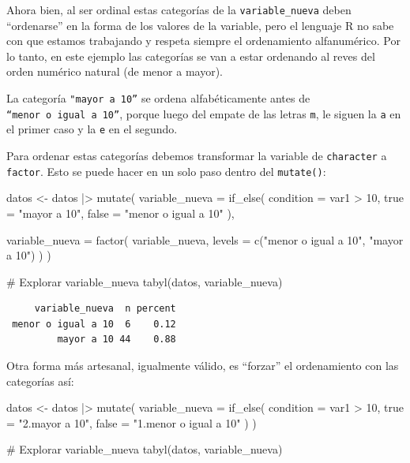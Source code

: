 \documentclass[
  spanish,
  a4paper,
]{scrbook}
\newenvironment{Shaded}{\begin{snugshade}}{\end{snugshade}}
\newcommand{\AttributeTok}[1]{\textcolor[rgb]{0.40,0.45,0.13}{#1}}
\newcommand{\CommentTok}[1]{\textcolor[rgb]{0.37,0.37,0.37}{#1}}
\newcommand{\DecValTok}[1]{\textcolor[rgb]{0.68,0.00,0.00}{#1}}
\newcommand{\FunctionTok}[1]{\textcolor[rgb]{0.28,0.35,0.67}{#1}}
\newcommand{\NormalTok}[1]{\textcolor[rgb]{0.00,0.23,0.31}{#1}}
\newcommand{\OtherTok}[1]{\textcolor[rgb]{0.00,0.23,0.31}{#1}}
\newcommand{\SpecialCharTok}[1]{\textcolor[rgb]{0.37,0.37,0.37}{#1}}
\newcommand{\StringTok}[1]{\textcolor[rgb]{0.13,0.47,0.30}{#1}}
\begin{document}
Ahora bien, al ser ordinal estas categorías de la
\texttt{variable\_nueva} deben ``ordenarse'' en la forma de los valores
de la variable, pero el lenguaje R no sabe con que estamos trabajando y
respeta siempre el ordenamiento alfanumérico. Por lo tanto, en este
ejemplo las categorías se van a estar ordenando al reves del orden
numérico natural (de menor a mayor).

La categoría \texttt{"mayor\ a\ 10”} se ordena alfabéticamente antes de
\texttt{“menor\ o\ igual\ a\ 10”}, porque luego del empate de las letras
\texttt{m}, le siguen la \texttt{a} en el primer caso y la \texttt{e} en
el segundo.

Para ordenar estas categorías debemos transformar la variable de
\texttt{character} a \texttt{factor}. Esto se puede hacer en un solo
paso dentro del \texttt{mutate()}:

\begin{Shaded}
\begin{Highlighting}[]
\NormalTok{datos }\OtherTok{\textless{}{-}}\NormalTok{ datos }\SpecialCharTok{|\textgreater{}}
  \FunctionTok{mutate}\NormalTok{(}
    \AttributeTok{variable\_nueva =} \FunctionTok{if\_else}\NormalTok{(}
      \AttributeTok{condition =}\NormalTok{ var1 }\SpecialCharTok{\textgreater{}} \DecValTok{10}\NormalTok{,}
      \AttributeTok{true =} \StringTok{"mayor a 10"}\NormalTok{,}
      \AttributeTok{false =} \StringTok{"menor o igual a 10"}
\NormalTok{    ),}

    \AttributeTok{variable\_nueva =} \FunctionTok{factor}\NormalTok{(}
\NormalTok{      variable\_nueva,}
      \AttributeTok{levels =} \FunctionTok{c}\NormalTok{(}\StringTok{"menor o igual a 10"}\NormalTok{, }\StringTok{"mayor a 10"}\NormalTok{)}
\NormalTok{    )}
\NormalTok{  )}

\CommentTok{\# Explorar variable\_nueva}
\FunctionTok{tabyl}\NormalTok{(datos, variable\_nueva)}
\end{Highlighting}
\end{Shaded}

\begin{verbatim}
     variable_nueva  n percent
 menor o igual a 10  6    0.12
         mayor a 10 44    0.88
\end{verbatim}

Otra forma más artesanal, igualmente válido, es ``forzar'' el
ordenamiento con las categorías así:

\begin{Shaded}
\begin{Highlighting}[]
\NormalTok{datos }\OtherTok{\textless{}{-}}\NormalTok{ datos }\SpecialCharTok{|\textgreater{}}
  \FunctionTok{mutate}\NormalTok{(}
    \AttributeTok{variable\_nueva =} \FunctionTok{if\_else}\NormalTok{(}
      \AttributeTok{condition =}\NormalTok{ var1 }\SpecialCharTok{\textgreater{}} \DecValTok{10}\NormalTok{,}
      \AttributeTok{true =} \StringTok{"2.mayor a 10"}\NormalTok{,}
      \AttributeTok{false =} \StringTok{"1.menor o igual a 10"}
\NormalTok{    )}
\NormalTok{  )}

\CommentTok{\# Explorar variable\_nueva}
\FunctionTok{tabyl}\NormalTok{(datos, variable\_nueva)}
\end{Highlighting}
\end{Shaded}
\end{document}
